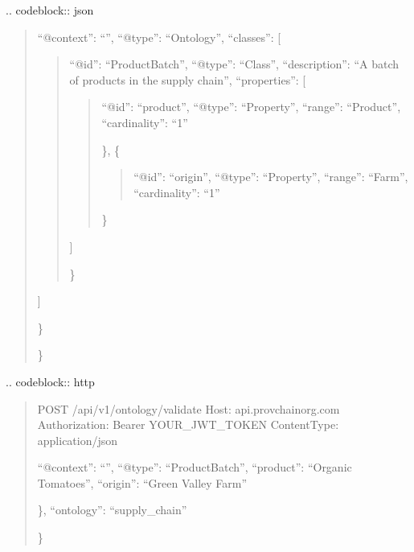 \documentclass[letterpaper,10pt,english]{sphinxmanual}
\begin{document}
\sphinxAtStartPar
{}
.. code\sphinxhyphen{}block:: json
\begin{quote}
\begin{description}
\sphinxlineitem{\{}\begin{description}
\sphinxAtStartPar
“@context”: “”,
“@type”: “Ontology”,
“classes”: {[}
\begin{quote}
\begin{description}
\sphinxlineitem{\{}
\sphinxAtStartPar
“@id”: “ProductBatch”,
“@type”: “Class”,
“description”: “A batch of products in the supply chain”,
“properties”: {[}
\begin{quote}
\begin{description}
\sphinxlineitem{\{}
\sphinxAtStartPar
“@id”: “product”,
“@type”: “Property”,
“range”: “Product”,
“cardinality”: “1”

\end{description}

\sphinxAtStartPar
\},
\{
\begin{quote}

\sphinxAtStartPar
“@id”: “origin”,
“@type”: “Property”,
“range”: “Farm”,
“cardinality”: “1”
\end{quote}

\sphinxAtStartPar
\}
\end{quote}

\sphinxAtStartPar
{]}

\end{description}

\sphinxAtStartPar
\}
\end{quote}

\sphinxAtStartPar
{]}

\end{description}

\sphinxAtStartPar
\}

\end{description}

\sphinxAtStartPar
\}
\end{quote}

\sphinxAtStartPar
{}
.. code\sphinxhyphen{}block:: http
\begin{quote}

\sphinxAtStartPar
POST /api/v1/ontology/validate
Host: api.provchain\sphinxhyphen{}org.com
Authorization: Bearer YOUR\_JWT\_TOKEN
Content\sphinxhyphen{}Type: application/json
\begin{description}
\sphinxlineitem{\{}\begin{description}
\sphinxAtStartPar
“@context”: “”,
“@type”: “ProductBatch”,
“product”: “Organic Tomatoes”,
“origin”: “Green Valley Farm”

\end{description}

\sphinxAtStartPar
\},
“ontology”: “supply\_chain”

\end{description}

\sphinxAtStartPar
\}
\end{quote}
\end{document}
